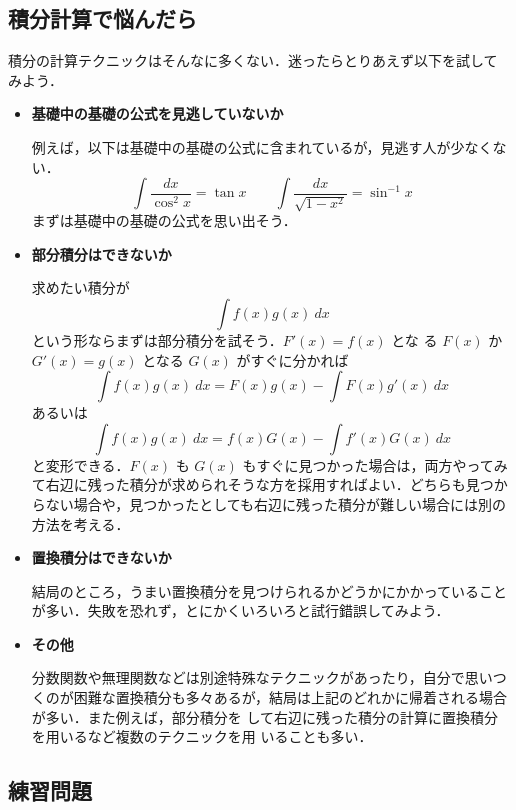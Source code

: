 \documentclass[10pt, uplatex, dvipdfmx]{jsarticle}
\theoremstyle{definition}
\numberwithin{equation}{section}
\begin{document}
\subsection{積分計算で悩んだら}

積分の計算テクニックはそんなに多くない．迷ったらとりあえず以下を試して
みよう．


\begin{itemize}
  \setlength{\itemsep}{2zh}

\item \textbf{基礎中の基礎の公式を見逃していないか}

例えば，以下は基礎中の基礎の公式に含まれているが，見逃す人が少なくない．
\[
\int \frac{dx}{\cos^2 x} = \tan x \qquad 
\int \frac{dx}{\sqrt{1-x^2}}= \sin^{-1} x 
\]
まずは基礎中の基礎の公式を思い出そう．


\item \textbf{部分積分はできないか}

  求めたい積分が
  \[
    \int f(x) g(x) \ dx
  \]
  という形ならまずは部分積分を試そう．$F'(x)=f(x)$ とな
  る $F(x)$ か $G'(x) = g(x)$ となる $G(x)$ がすぐに分かれば
  \[
    \int f(x) g(x) \ dx = F(x) g(x) - \int F(x) g'(x) \ dx
  \]
  あるいは
  \[
    \int f(x) g(x) \ dx = f(x) G(x) - \int f'(x) G(x) \ dx
  \]
  と変形できる．$F(x)$ も $G(x)$ もすぐに見つかった場合は，両方やってみ
  て右辺に残った積分が求められそうな方を採用すればよい．どちらも見つか
  らない場合や，見つかったとしても右辺に残った積分が難しい場合には別の
  方法を考える．

\item \textbf{置換積分はできないか}

  結局のところ，うまい置換積分を見つけられるかどうかにかかっていること
  が多い．失敗を恐れず，とにかくいろいろと試行錯誤してみよう．

\item \textbf{その他}

  分数関数や無理関数などは別途特殊なテクニックがあったり，自分で思いつ
  くのが困難な置換積分も多々あるが，結局は上記のどれかに帰着される場合
  が多い．また例えば，部分積分を
  して右辺に残った積分の計算に置換積分を用いるなど複数のテクニックを用
  いることも多い．

\end{itemize}

\newpage

\subsection{練習問題}
\end{document}
